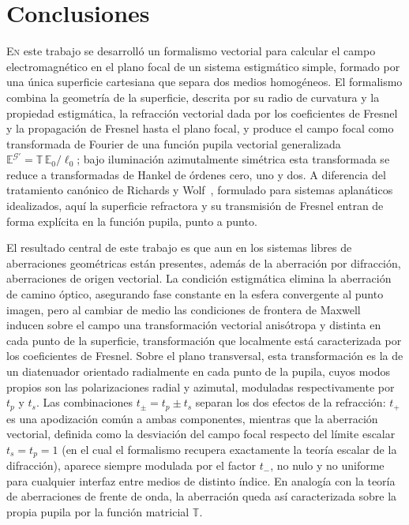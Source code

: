 \chapter*{Conclusiones}

\lettrine[lines=2]{E}{n} este trabajo se desarrolló un formalismo vectorial para
calcular el campo electromagnético en el plano focal de un sistema estigmático
simple, formado por una única superficie cartesiana que separa dos medios
homogéneos. El formalismo combina la geometría de la superficie, descrita
por su radio de curvatura y la propiedad estigmática, la refracción
vectorial dada por los coeficientes de Fresnel y la propagación de
Fresnel hasta el plano focal, y produce el campo focal como transformada de
Fourier de una función pupila vectorial generalizada
$\mathbb E^{\mathscr G'}=\mathbb T\,\mathbb E_0/\ell_0$; bajo iluminación
azimutalmente simétrica esta transformada se reduce a transformadas de Hankel
de órdenes cero, uno y dos. A diferencia del tratamiento canónico de Richards
y Wolf~\cite{RichardsWolf1959}, formulado para sistemas aplanáticos
idealizados, aquí la superficie refractora y su transmisión de Fresnel entran
de forma explícita en la función pupila, punto a punto.

El resultado central de este trabajo es que aun en los sistemas libres de
aberraciones geométricas están presentes, además de la aberración por
difracción, aberraciones de origen vectorial. La condición estigmática
elimina la aberración de camino óptico, asegurando fase constante en la
esfera convergente al punto imagen, pero al cambiar de medio las condiciones
de frontera de Maxwell~\cite{jackson1999} inducen sobre el campo una transformación vectorial
anisótropa y distinta en cada punto de la superficie, transformación que
localmente está caracterizada por los coeficientes de Fresnel. Sobre el plano transversal, esta transformación
es la de un diatenuador orientado radialmente en cada punto de la pupila,
cuyos modos propios son las polarizaciones radial y azimutal, moduladas
respectivamente por $t_p$ y $t_s$. Las combinaciones $t_\pm=t_p\pm t_s$
separan los dos efectos de la refracción: $t_+$ es una apodización común a
ambas componentes, mientras que la aberración vectorial, definida como la
desviación del campo focal respecto del límite escalar $t_s=t_p=1$ (en el
cual el formalismo recupera exactamente la teoría escalar de la difracción),
aparece siempre modulada por el factor $t_-$, no nulo y no uniforme para
cualquier interfaz entre medios de distinto índice. En analogía con la teoría
de aberraciones de frente de onda, la aberración queda así caracterizada
sobre la propia pupila por la función matricial $\mathbb T$.

